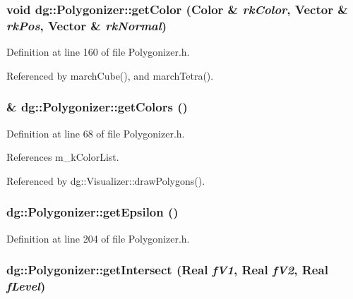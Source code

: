 \subsubsection{\setlength{\rightskip}{0pt plus 5cm}void dg::Polygonizer::get\-Color ({\bf Color} \& {\em rk\-Color}, {\bf Vector} \& {\em rk\-Pos}, {\bf Vector} \& {\em rk\-Normal})\hspace{0.3cm}{\tt  [inline]}}\label{classdg_1_1Polygonizer_a19}




Definition at line 160 of file Polygonizer.h.

Referenced by march\-Cube(), and march\-Tetra().
\subsubsection{\& dg::Polygonizer::get\-Colors ()\hspace{0.3cm}{\tt  [inline]}}\label{classdg_1_1Polygonizer_a17}




Definition at line 68 of file Polygonizer.h.

References m\_\-k\-Color\-List.

Referenced by dg::Visualizer::draw\-Polygons().
\subsubsection{ dg::Polygonizer::get\-Epsilon ()\hspace{0.3cm}{\tt  [inline]}}\label{classdg_1_1Polygonizer_a14}




Definition at line 204 of file Polygonizer.h.
\subsubsection{ dg::Polygonizer::get\-Intersect ({\bf Real} {\em f\-V1}, {\bf Real} {\em f\-V2}, {\bf Real} {\em f\-Level})\hspace{0.3cm}{\tt  [inline]}}\label{classdg_1_1Polygonizer_a18}




